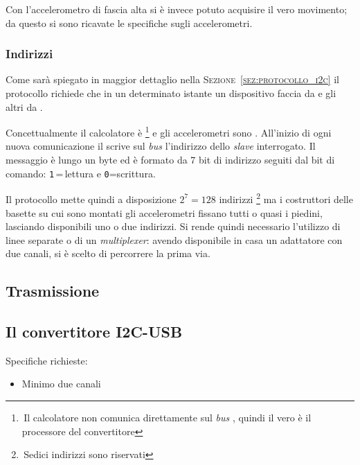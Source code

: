 	Con l'accelerometro di fascia alta si è invece potuto acquisire
    il vero movimento; da questo si sono ricavate le specifiche
    sugli accelerometri.
    
    
	\subsubsection {Indirizzi} \label{sssez:indirizzi}
    Come sarà spiegato in maggior dettaglio nella \textsc{Sezione~\ref{sez:protocollo_i2c}}
    il protocollo {\iic} richiede che in un determinato istante
    un dispositivo faccia da {\master} e gli altri da {\slave}.
    
    Concettualmente il calcolatore è {\master}
    \footnote{\,Il calcolatore non comunica direttamente sul \textit{bus} {\iic},
    quindi il vero {\master} è il processore del convertitore}
    e gli accelerometri sono {\slave}.
    All'inizio di ogni nuova comunicazione il \master{}
    scrive sul \textit{bus} l'indirizzo dello \textit{slave} interrogato.
    Il messaggio è lungo un byte ed è formato da 7 bit di indirizzo
    seguiti dal bit di comando: \texttt{1}\,=\,lettura e \texttt{0}=scrittura.
    
Il protocollo \iic{} mette quindi a disposizione
    \(2^7=128\) indirizzi \footnote{\,Sedici indirizzi sono riservati}
    ma i costruttori delle basette su cui sono montati gli accelerometri
    fissano tutti o quasi i piedini, lasciando disponibili uno o due indirizzi.
    Si rende quindi necessario l'utilizzo di linee separate o di un \textit{multiplexer}: avendo disponibile in casa un adattatore con due canali,
    si è scelto di percorrere la prima via.








\subsection{Trasmissione}
\label{ssez:trasmissione}



\subsection{Il convertitore I2C-USB}
    Specifiche richieste:
	\begin{itemize}
	  \item Minimo due canali
	\end{itemize}

